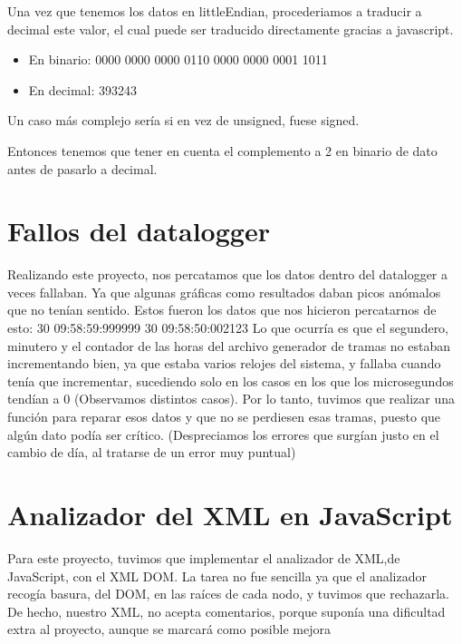 Una vez que tenemos los datos en littleEndian, procederiamos a traducir a decimal este valor, el cual puede ser traducido directamente gracias a javascript.
\begin{itemize}
	\item En binario: 0000 0000 0000 0110 0000 0000 0001 1011

	\item En decimal:  393243

\end{itemize}

Un caso más complejo sería si en vez de unsigned, fuese signed. 

Entonces tenemos que tener en cuenta el complemento a 2 en binario de dato antes de pasarlo a decimal.

 
\section{Fallos del datalogger}



Realizando este proyecto, nos percatamos que los datos dentro del datalogger a veces fallaban.
Ya que algunas gráficas como resultados daban picos anómalos que no tenían sentido.
Estos fueron los datos que nos hicieron percatarnos de esto:
30 09:58:59:999999
30 09:58:50:002123
Lo que ocurría es que el segundero, minutero y el contador de las horas del archivo generador de tramas no estaban incrementando bien, ya que estaba varios relojes del sistema, y fallaba cuando tenía que incrementar, sucediendo solo en los casos en los que los microsegundos tendían a 0 (Observamos distintos casos).
Por lo tanto, tuvimos que realizar una función para reparar esos datos y que no se perdiesen esas tramas, puesto que algún dato podía ser crítico. (Despreciamos los errores que surgían justo en el cambio de día, al tratarse de un error muy puntual)

\section{Analizador del XML en JavaScript}


Para este proyecto, tuvimos que implementar el analizador de XML,de JavaScript, con el XML DOM. La tarea no fue sencilla ya que el analizador recogía basura, del DOM, en las raíces de cada nodo, y tuvimos que rechazarla. De hecho, nuestro XML, no acepta comentarios, porque suponía una dificultad extra al proyecto, aunque se marcará como posible mejora



